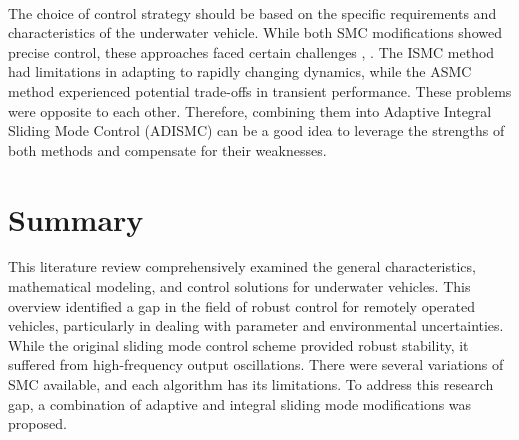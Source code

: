     \\
    The choice of control strategy should be based on the specific
    requirements and characteristics of the underwater vehicle. While both SMC modifications showed
    precise control, these approaches faced certain challenges \cite{integral_smc}, \cite{adaptive_smc}. The ISMC method had limitations in adapting to rapidly changing dynamics, while the ASMC method experienced potential trade-offs in transient performance.
    These problems were opposite to each other. Therefore, combining them into Adaptive Integral Sliding
    Mode Control (ADISMC) can be a good idea to leverage the strengths of both methods and compensate
    for their weaknesses.

\section{Summary}

    This literature review comprehensively examined the general characteristics, mathematical modeling,
    and control solutions for underwater vehicles. This overview identified a gap in the field of robust
    control for remotely operated vehicles, particularly in dealing with parameter and environmental
    uncertainties. While the original sliding mode control scheme provided robust stability, it suffered
    from high-frequency output oscillations. There were several variations of SMC available, and each
    algorithm has its limitations. To address this research gap, a combination of adaptive and integral
    sliding mode modifications was proposed.